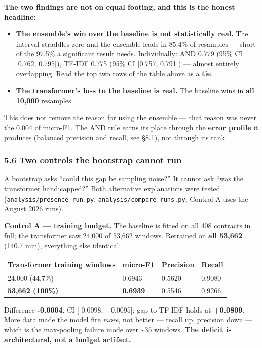 \documentclass[
  10pt,
]{article}
\providecommand{\tightlist}{%
  \setlength{\itemsep}{0pt}\setlength{\parskip}{0pt}}
\begin{document}
\textbf{The two findings are not on equal footing, and this is the honest
headline:}

\begin{itemize}
\tightlist
\item
  \textbf{The ensemble's win over the baseline is not statistically real.} The
  interval straddles zero and the ensemble leads in 85.4\% of resamples ---
  short of the 97.5\% a significant result needs. Individually: AND 0.779 (95\%
  CI {[}0.762, 0.795{]}), TF-IDF 0.775 (95\% CI {[}0.757, 0.791{]}) --- almost
  entirely overlapping. Read the top two rows of the table above as a
  \textbf{tie}.
\item
  \textbf{The transformer's loss to the baseline is real.} The baseline wins in
  \textbf{all 10,000} resamples.
\end{itemize}

This does not remove the reason for using the ensemble --- that reason was never
the 0.004 of micro-F1. The AND rule earns its place through the \textbf{error
profile} it produces (balanced precision and recall, see §8.1), not through its
rank.

\subsubsection{5.6 Two controls the bootstrap cannot run}

A bootstrap asks ``could this gap be sampling noise?'' It cannot ask ``was the
transformer handicapped?'' Both alternative explanations were tested
(\texttt{analysis/presence\_run.py}, \texttt{analysis/compare\_runs.py}; Control
A uses the August 2026 runs).

\textbf{Control A --- training budget.} The baseline is fitted on all 408
contracts in full; the transformer saw 24,000 of 53,662 windows. Retrained on
\textbf{all 53,662} (140.7 min), everything else identical:

\begin{longtable}[]{@{}llll@{}}
\toprule
Transformer training windows & micro-F1 & Precision & Recall \\
\midrule
\endhead
24,000 (44.7\%) & 0.6943 & 0.5620 & 0.9080 \\
\textbf{53,662 (100\%)} & \textbf{0.6939} & 0.5546 & 0.9266 \\
\bottomrule
\end{longtable}

Difference \textbf{-0.0004}, CI {[}-0.0098, +0.0095{]}; gap to TF-IDF holds at
\textbf{+0.0809}. More data made the model fire \emph{more}, not better ---
recall up, precision down --- which is the max-pooling failure mode over
\textasciitilde35 windows. \textbf{The deficit is architectural, not a budget
artifact.}
\end{document}
